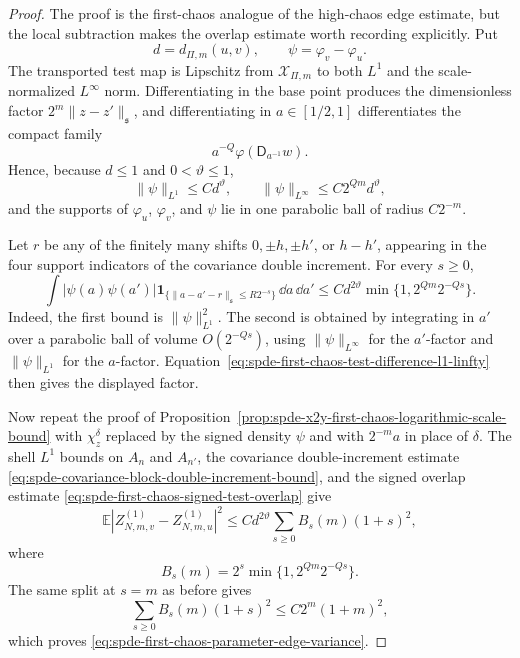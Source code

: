 \begin{proof}
The proof is the first-chaos analogue of the high-chaos edge estimate, but the
local subtraction makes the overlap estimate worth recording explicitly.  Put
\[
  d=d_{\Pi,m}(u,v),
  \qquad
  \psi=\varphi_v-\varphi_u .
\]
The transported test map is Lipschitz from \(\mathcal X_{\Pi,m}\) to both
\(L^1\) and the scale-normalized \(L^\infty\) norm.  Differentiating in the
base point produces the dimensionless factor \(2^m\|z-z'\|_{\mathfrak s}\),
and differentiating in \(a\in[1/2,1]\) differentiates the compact family
\[
  a^{-Q}\varphi(\mathsf D_{a^{-1}}w).
\]
Hence, because \(d\leq1\) and \(0<\vartheta\leq1\),
\begin{equation}
  \|\psi\|_{L^1}\leq C d^\vartheta,
  \qquad
  \|\psi\|_{L^\infty}\leq C2^{Qm}d^\vartheta,
  \label{eq:spde-first-chaos-test-difference-l1-linfty}
\end{equation}
and the supports of \(\varphi_u\), \(\varphi_v\), and \(\psi\) lie in one
parabolic ball of radius \(C2^{-m}\).

Let \(r\) be any of the finitely many shifts
\(0,\pm h,\pm h'\), or \(h-h'\), appearing in the four support indicators of
the covariance double increment.  For every \(s\geq0\),
\begin{equation}
  \int
  |\psi(a)\psi(a')|
  \mathbf 1_{\{\|a-a'-r\|_{\mathfrak s}\leq R2^{-s}\}}
  \,\dd a\,\dd a'
  \leq
  C d^{2\vartheta}\min\{1,2^{Qm}2^{-Qs}\}.
  \label{eq:spde-first-chaos-signed-test-overlap}
\end{equation}
Indeed, the first bound is \(\|\psi\|_{L^1}^2\).  The second is obtained by
integrating in \(a'\) over a parabolic ball of volume \(O(2^{-Qs})\), using
\(\|\psi\|_{L^\infty}\) for the \(a'\)-factor and \(\|\psi\|_{L^1}\) for the
\(a\)-factor.  Equation~\eqref{eq:spde-first-chaos-test-difference-l1-linfty}
then gives the displayed factor.

Now repeat the proof of
Proposition~\ref{prop:spde-x2y-first-chaos-logarithmic-scale-bound} with
\(\chi_z^\delta\) replaced by the signed density \(\psi\) and with
\(2^{-m}a\) in place of \(\delta\).  The shell \(L^1\) bounds on
\(A_n\) and \(A_{n'}\), the covariance double-increment estimate
\eqref{eq:spde-covariance-block-double-increment-bound}, and the signed
overlap estimate \eqref{eq:spde-first-chaos-signed-test-overlap} give
\[
  \mathbb E
  |Z_{N,m,v}^{(1)}-Z_{N,m,u}^{(1)}|^2
  \leq
  C d^{2\vartheta}
  \sum_{s\geq0}
  B_s(m)(1+s)^2,
\]
where
\[
  B_s(m)=2^s\min\{1,2^{Qm}2^{-Qs}\}.
\]
The same split at \(s=m\) as before gives
\[
  \sum_{s\geq0}B_s(m)(1+s)^2\leq C2^m(1+m)^2,
\]
which proves
\eqref{eq:spde-first-chaos-parameter-edge-variance}.


\end{proof}
